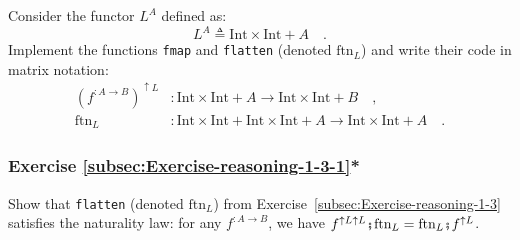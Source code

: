 Consider the functor $L^{A}$ defined as:
\[
L^{A}\triangleq\text{Int}\times\text{Int}+A\quad.
\]
Implement the functions \lstinline!fmap! and \lstinline!flatten!
(denoted $\text{ftn}_{L}$) and write their code in matrix notation:
\begin{align*}
(f^{:A\rightarrow B})^{\uparrow L} & :\text{Int}\times\text{Int}+A\rightarrow\text{Int}\times\text{Int}+B\quad,\\
\text{ftn}_{L} & :\text{Int}\times\text{Int}+\text{Int}\times\text{Int}+A\rightarrow\text{Int}\times\text{Int}+A\quad.
\end{align*}


\subsubsection{Exercise \label{subsec:Exercise-reasoning-1-3-1}\ref{subsec:Exercise-reasoning-1-3-1}{*}}

Show that \lstinline!flatten! (denoted $\text{ftn}_{L}$) from Exercise~\ref{subsec:Exercise-reasoning-1-3}
satisfies the naturality law: for any $f^{:A\rightarrow B}$, we have
$f^{\uparrow L\uparrow L}\bef\text{ftn}_{L}=\text{ftn}_{L}\bef f^{\uparrow L}$.
